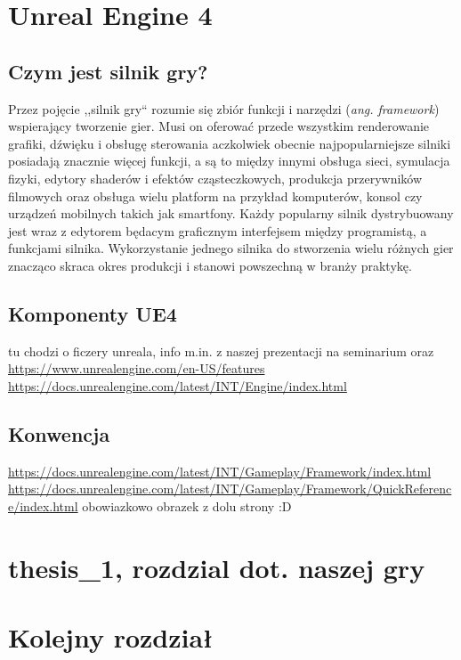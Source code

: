 \documentclass[multip]{SGGW-thesis}
\begin{document}
\chapter{Unreal Engine 4}
\section{Czym jest silnik gry?}
Przez pojęcie ,,silnik gry`` rozumie się zbiór funkcji i narzędzi ({\em ang. framework}) wspierający tworzenie gier. Musi on oferować przede wszystkim renderowanie grafiki, dźwięku i obsługę sterowania aczkolwiek obecnie najpopularniejsze silniki posiadają znacznie więcej funkcji, a są to między innymi obsługa sieci, symulacja fizyki, edytory shaderów i efektów cząsteczkowych, produkcja przerywników filmowych oraz obsługa wielu platform na przykład komputerów, konsol czy urządzeń mobilnych takich jak smartfony. Każdy popularny silnik dystrybuowany jest wraz z edytorem będacym graficznym interfejsem między programistą, a funkcjami silnika.
\newline Wykorzystanie jednego silnika do stworzenia wielu różnych gier znacząco skraca okres produkcji i stanowi powszechną w branży praktykę.\cite{learning-unreal}\cite{wiki-game-engine}

\section{Komponenty UE4}
tu chodzi o ficzery unreala, info m.in. z naszej prezentacji na seminarium oraz
\newline\url{https://www.unrealengine.com/en-US/features}
\newline\url{https://docs.unrealengine.com/latest/INT/Engine/index.html}

\section{Konwencja}
\url{https://docs.unrealengine.com/latest/INT/Gameplay/Framework/index.html}
\newline\url{https://docs.unrealengine.com/latest/INT/Gameplay/Framework/QuickReference/index.html}
\newline obowiazkowo obrazek z dolu strony :D

\chapter{thesis\_1, rozdzial dot. naszej gry}

\chapter{Kolejny rozdział}
\end{document}

